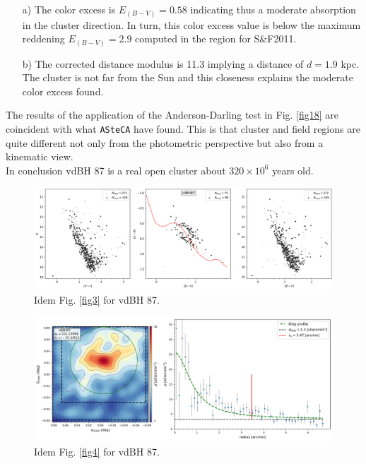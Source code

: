 \documentclass[draft]{aa}
\begin{document}
\begin{itemize}
\item [a)] The color excess is $E_{(B-V)} = 0.58$ indicating thus a moderate
    absorption in the cluster direction. In turn, this color excess value is
    below the maximum reddening $E_{(B-V)} = 2.9$ computed in the region for 
    S\&F2011.
\item [b)] The corrected distance modulus is 11.3 implying a distance of $d =
    1.9$ kpc. The cluster is not far from the Sun and this closeness explains
    the moderate color excess found.
\end{itemize}

The results of the application of the Anderson-Darling test in Fig. \ref{fig18}
are coincident with what \texttt{ASteCA} have found. This is that cluster and
field regions are quite different not only from the photometric perspective but
also from a kinematic view.\\

In conclusion vdBH 87 is a real open cluster about $320\times10^6$ years old.

\begin{figure}[ht]
    \centering
    \includegraphics[width=\hsize]{../figs/obs_vdBH87.png}
    \caption{Idem Fig. \ref{fig3} for vdBH 87.}
    \label{fig15}
\end{figure}

\begin{figure}[ht]
    \centering
    \includegraphics[width=\hsize]{../figs/dmap_vdbh87.png}
    \caption{Idem Fig. \ref{fig4} for vdBH 87.}
    \label{fig16}
\end{figure}
\end{document}
